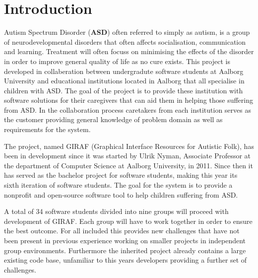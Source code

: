 \chapter{Introduction}
Autism Spectrum Disorder (\textbf{ASD}) often referred to simply as autism, is a 
group of neurodevelopmental disorders that often affects socialisation, communication and learning.
Treatment will often focuss on minimising the effects of the disorder in order to improve general quality of life as no cure exists.
This project is developed in collaberation between undergradute  software students at Aalborg University and educational  institutions located in Aalborg that all specialise in children with ASD.
The goal of the project is to provide these institution with software solutions for their caregivers that can aid them in helping those suffering from ASD.
In the collaboration process caretakers from each institution serves as the customer providing general knowledge of problem domain as well as requirements for the system.

The project, named GIRAF (Graphical Interface Resources for Autistic Folk), has been in development since it was started by Ulrik Nyman, Associate Professor at the department of Computer Science at Aalborg University, in 2011. 
Since then it has served as the bachelor project for software students, making this year its sixth iteration of software students.
The goal for the system is to provide a nonprofit and open-source software tool to help children suffering from ASD.

A total of 34 software students divided into nine groups will proceed with development of GIRAF.
Each group will have to work together in order to ensure the best outcome.
For all included this provides new challenges that have not been present in previous experience working on smaller projects in independent group environments.
Furthermore the inherited project already contains a large existing code base, unfamiliar to this years developers providing a further set of challenges.

